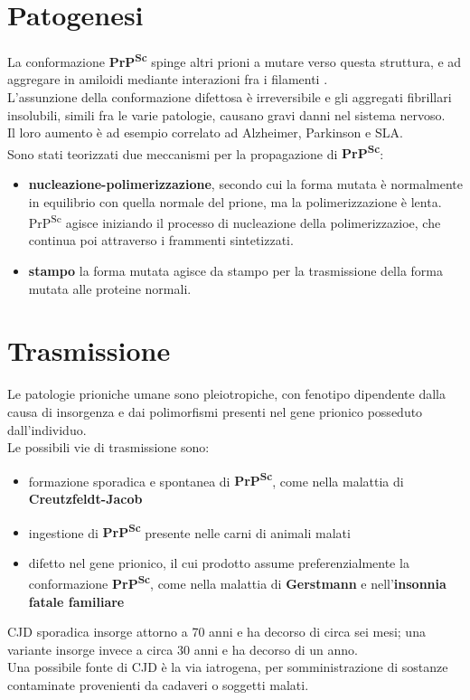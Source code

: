 \documentclass[a4paper, 12pt]{article}
\begin{document}
\section{Patogenesi}
La conformazione \textbf{PrP\textsuperscript{Sc}} spinge altri prioni a mutare verso questa struttura, e ad aggregare in amiloidi mediante interazioni fra i filamenti \textbeta.\\
L'assunzione della conformazione difettosa è irreversibile e gli aggregati fibrillari insolubili, simili fra le varie patologie, causano gravi danni nel sistema nervoso.\\
Il loro aumento è ad esempio correlato ad Alzheimer, Parkinson e SLA.\\
Sono stati teorizzati due meccanismi per la propagazione di \textbf{PrP\textsuperscript{Sc}}:
\begin{itemize}
\item \textbf{nucleazione-polimerizzazione}, secondo cui la forma mutata è normalmente in equilibrio con quella normale del prione, ma la polimerizzazione è lenta. PrP\textsuperscript{Sc} agisce iniziando il processo di nucleazione della polimerizzazioe, che continua poi attraverso i frammenti sintetizzati.
\item \textbf{stampo} la forma mutata agisce da stampo per la trasmissione della forma mutata alle proteine normali.
\end{itemize}

\section{Trasmissione}
Le patologie prioniche umane sono pleiotropiche, con fenotipo dipendente dalla causa di insorgenza e dai polimorfismi presenti nel gene prionico posseduto dall'individuo.\\
Le possibili vie di trasmissione sono:
\begin{itemize}
\item formazione sporadica e spontanea di \textbf{PrP\textsuperscript{Sc}}, come nella malattia di \textbf{Creutzfeldt-Jacob}
\item ingestione di \textbf{PrP\textsuperscript{Sc}} presente nelle carni di animali malati
\item difetto nel gene prionico, il cui prodotto assume preferenzialmente la conformazione \textbf{PrP\textsuperscript{Sc}}, come nella malattia di \textbf{Gerstmann} e nell'\textbf{insonnia fatale familiare}
\end{itemize}
CJD sporadica insorge attorno a 70 anni e ha decorso di circa sei mesi; una variante insorge invece a circa 30 anni e ha decorso di un anno.\\
Una possibile fonte di CJD è la via iatrogena, per somministrazione di sostanze contaminate provenienti da cadaveri o soggetti malati.
\end{document}
